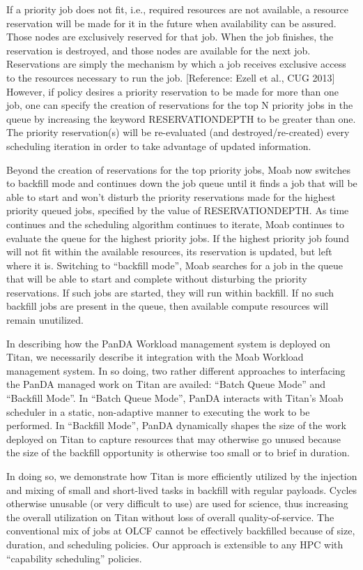 If a priority job does not fit, i.e., required resources are not available, a
resource reservation will be made for it in the future when availability can be
assured. Those nodes are exclusively reserved for that job. When the job
finishes, the reservation is destroyed, and those nodes are available for the
next job. Reservations are simply the mechanism by which a job receives
exclusive access to the resources necessary to run the job. [Reference: Ezell
et al., CUG 2013] However, if policy desires a priority reservation to be made
for more than one job, one can specify the creation of reservations for the top
N priority jobs in the queue by increasing the keyword RESERVATIONDEPTH to be
greater than one.  The priority reservation(s) will be re-evaluated (and
destroyed/re-created) every scheduling iteration in order to take advantage of
updated information.

Beyond the creation of reservations for the top priority jobs, Moab now
switches to backfill mode and continues down the job queue until it finds a job
that will be able to start and won't disturb the priority reservations made for
the highest priority queued jobs, specified by the value of RESERVATIONDEPTH.
As time continues and the scheduling algorithm continues to iterate, Moab
continues to evaluate the queue for the highest priority jobs. If the highest
priority job found will not fit within the available resources, its reservation
is updated, but left where it is. Switching to ``backfill mode'', Moab searches
for a job in the queue that will be able to start and complete without
disturbing the priority reservations.  If such jobs are started, they will run
within backfill.  If no such backfill jobs are present in the queue, then
available compute resources will remain unutilized.

In describing how the PanDA Workload management system is deployed on Titan, we
necessarily describe it integration with the Moab Workload management system.
In so doing, two rather different approaches to interfacing the PanDA managed
work on Titan are availed: ``Batch Queue Mode'' and ``Backfill Mode''.  In
``Batch Queue Mode'', PanDA interacts with Titan's Moab scheduler in a static,
non-adaptive manner to executing the work to be performed.  In ``Backfill
Mode'', PanDA  dynamically shapes the size of the work deployed on Titan to
capture resources that may otherwise go unused because the size of the backfill
opportunity is otherwise too small or to brief in duration.

In doing so, we demonstrate how Titan is more efficiently utilized by the
injection and mixing of small and short-lived tasks in backfill with regular
payloads. Cycles otherwise unusable (or very difficult to use) are used for
science, thus increasing the overall utilization on Titan without loss of
overall quality-of-service. The conventional mix of jobs at OLCF cannot be
effectively backfilled because of size, duration, and scheduling policies. Our
approach is extensible to any HPC with ``capability scheduling'' policies. 

